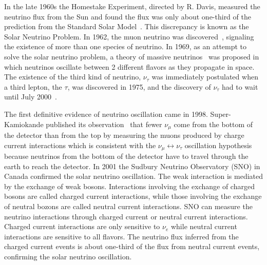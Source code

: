 In the late 1960s the Homestake Experiment, directed by R. Davis, measured the neutrino flux from the Sun and found the flux was only about one-third of the prediction from the Standard Solar Model~\cite{Bahcall2003}. This discrepancy is known as the Solar Neutrino Problem. In 1962, the muon neutrino was discovered~\cite{Danby1962}, signaling the existence of more than one species of neutrino. In 1969, as an attempt to solve the solar neutrino problem, a theory of massive neutrinos~\cite{Gribov1969} was proposed in which neutrinos oscillate between 2 different flavors as they propagate in space. The existence of the third kind of neutrino, $\nu_{\tau}$ was immediately postulated when a third lepton, the $\tau$, was discovered in 1975, and the discovery of $\nu_{\tau}$ had to wait until July 2000~\cite{Donut2001}.

The first definitive evidence of neutrino oscillation came in 1998. Super-Kamiokande published its observation~\cite{Fukuda1998} that fewer $\nu_{\mu}$ come from the bottom of the detector than from the top by measuring the muons produced by charge current interactions which is consistent with the $\nu_{\mu}\leftrightarrow \nu_{\tau}$ oscillation hypothesis because neutrinos from the bottom of the detector have to travel through the earth to reach the detector. In 2001 the Sudbury Neutrino Observatory (SNO) in Canada confirmed the solar neutrino oscillation. The weak interaction is mediated by the exchange of weak bosons. Interactions involving the exchange of charged bosons are called charged current interactions, while those involving the exchange of neutral bozons are called neutral current interactions. SNO can measure the neutrino interactions through charged current or neutral current interactions. Charged current interactions are only sensitive to $\nu_e$ while neutral current interactions are sensitive to all flavors. The neutrino flux inferred from the charged current events is about one-third of the flux from neutral current events, confirming the solar neutrino oscillation.

